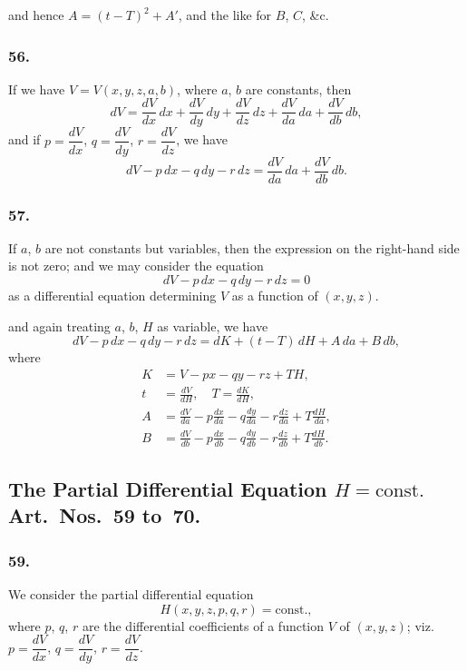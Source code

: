 \documentclass[11pt,a4paper]{book}
\begin{document}
\newpage
\setcounter{page}{137}

and hence $A = (t - T)^{2} + A'$, and the like for $B$, $C$, \&c.

\subsubsection*{56.}

If we have $V = V(x, y, z, a, b)$, where $a$, $b$ are constants, then
\[
dV = \frac{dV}{dx}\,dx + \frac{dV}{dy}\,dy + \frac{dV}{dz}\,dz + \frac{dV}{da}\,da + \frac{dV}{db}\,db,
\]
and if $p = \dfrac{dV}{dx}$, $q = \dfrac{dV}{dy}$, $r = \dfrac{dV}{dz}$, we have
\[
dV - p\,dx - q\,dy - r\,dz = \frac{dV}{da}\,da + \frac{dV}{db}\,db.
\]

\subsubsection*{57.}

If $a$, $b$ are not constants but variables, then the expression on the right-hand side is not zero; and we may consider the equation
\[
dV - p\,dx - q\,dy - r\,dz = 0
\]
as a differential equation determining $V$ as a function of $(x, y, z)$.

\newpage
\setcounter{page}{138}

and again treating $a$, $b$, $H$ as variable, we have
\[
dV - p\,dx - q\,dy - r\,dz = dK + (t - T)\,dH + A\,da + B\,db,
\]
where
\begin{align*}
K &= V - px - qy - rz + T H, \\
t &= \frac{dV}{dH}, \quad T = \frac{dK}{dH}, \\
A &= \frac{dV}{da} - p\frac{dx}{da} - q\frac{dy}{da} - r\frac{dz}{da} + T\frac{dH}{da}, \\
B &= \frac{dV}{db} - p\frac{dx}{db} - q\frac{dy}{db} - r\frac{dz}{db} + T\frac{dH}{db}.
\end{align*}

\subsection*{The Partial Differential Equation $H = \text{const.}$ Art.~Nos.~59 to~70.}

\subsubsection*{59.}

We consider the partial differential equation
\[
H(x, y, z, p, q, r) = \text{const.},
\]
where $p$, $q$, $r$ are the differential coefficients of a function $V$ of $(x, y, z)$; viz.~$p = \dfrac{dV}{dx}$, $q = \dfrac{dV}{dy}$, $r = \dfrac{dV}{dz}$.
\end{document}
